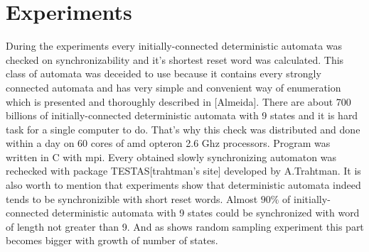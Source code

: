 \documentclass[11pt]{llncs}
\begin{document}
\section{Experiments}
\label{experiments}
During the experiments every initially-connected deterministic automata was checked on synchronizability and it's shortest reset word was
calculated. This class of automata was deceided to use because it contains every strongly connected automata and has very simple and convenient
way of enumeration which is presented and thoroughly described in [Almeida]. There are about 700 billions of initially-connected deterministic automata
with 9 states and it is hard task for a single computer to do. That's why this check was distributed and done within a day on 60 cores of
amd opteron 2.6 Ghz processors. Program was written in C with mpi. Every obtained slowly synchronizing automaton was rechecked
with package TESTAS[trahtman's site]
developed by A.Trahtman.
It is also worth to mention that experiments show that deterministic automata indeed tends to be synchronizible with short reset words.
Almost $90\%$ of initially-connected deterministic automata with 9 states could be synchronized with word of length not greater than 9.
And as shows random sampling experiment this part becomes bigger with growth of number of states.
\end{document}
